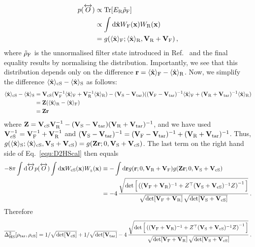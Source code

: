 \documentclass[aps,prx,onecolumn,superscriptaddress,floatfix,longbibliography,amsmath,amssymb]{revtex4-2}
\newcommand{\fil}{_{\text F}}
\newcommand{\rfil}{_{\text R}}
\newcommand{\sm}{_{\text S}}
\newcommand{\csm}{_{\rm cS}}
\newcommand{\tar}{_{\rm tar}}
\newcommand{\dd}{{\rm d}}
\newcommand{\bx}{\hat{\bf x}}
\newcommand{\tp}{^\top}
\newcommand{\ex}[1]{\langle #1 \rangle}
\newcommand{\both}[1]{\overleftrightarrow{#1}}
\newcommand{\Tr}{{\rm Tr}}
\newcommand{\inv}{^{-1}}
\newcommand{\beq}{\begin{equation}}
\newcommand{\eeq}{\end{equation}}
\begin{document}
\beq
\begin{split}
p(\both{O}) &\propto \Tr[E\rfil\tilde{\rho}\fil]\\
&\propto \int\dd\bx W\fil({\bf x})W\rfil({\bf x})\\
&= g(\ex{\bx}\fil;\ex{\bx}\rfil,{\bf V}\rfil + {\bf V}\fil)\,,\\
\end{split}
\eeq
where $\tilde{\rho}\fil$ is the unnormalised filter state introduced in Ref.~\cite{guevara2015quantum} and the final equality results by normalising the distribution. Importantly, we see that this distribution depends only on the difference ${\bf r} = \ex{\bx}\fil - \ex{\bx}\rfil$. Now, we simplify the difference $\ex{\bx}\csm - \ex{\bx}\sm$ as follows: 
\beq
\begin{split}
\ex{\bx}\csm - \ex{\bx}\sm &= {\bf V}\csm({\bf V}\fil\inv \ex{\bx}\fil + {\bf V}\rfil\inv \ex{\bx}\rfil) - ({\bf V}\sm - {\bf V}\tar)(({\bf V}\fil - {\bf V}\tar)\inv \ex{\bx}\fil + ({\bf V}\rfil + {\bf V}\tar)\inv \ex{\bx}\rfil)\\
& = {\bf Z}(\ex{\bx}\rfil - \ex{\bx}\fil)\\
& = {\bf Z}{\bf r} 
\end{split}\label{eq:csm_sm_diff}
\eeq
where ${\bf Z} = {\bf V}_{\rm cS} {\bf V}\rfil^{-1} - ({\bf V}\sm - {\bf V}\tar)({\bf V}\rfil + {\bf V}\tar)^{-1}$, and we have used ${\bf V}\csm\inv = {\bf V}\fil\inv + {\bf V}\rfil\inv$ and $({\bf V}\sm - {\bf V}\tar)\inv = ({\bf V}\fil - {\bf V}\tar)\inv + ({\bf V}\rfil + {\bf V}\tar)\inv$. Thus, $g(\ex{\bx}\sm;\ex{\bx}_{\rm cS},{\bf V}\sm + {\bf V}_{\rm cS}) = g({\bf Z}{\bf r};0,{\bf V}\sm + {\bf V}_{\rm cS})$. The last term on the right hand side of Eq.~\eqref{equ:D2HScal} then equals
\beq
\begin{split}
-8\pi\int \dd\both{O} p(\both{O}) \int\dd{\bf x} W_{\rm cS}({\bf x})W_{\sm}({\bf x})&\equiv -\int \dd{\bf r} g({\bf r};0,{\bf V}\rfil + {\bf V}\fil)g({\bf Z}{\bf r};0,{\bf V}\sm + {\bf V}_{\rm cS}) \\
&= -4\,\frac{\sqrt{\det\Big[\left(({\bf V}\fil+{\bf V}\rfil)\inv + Z\tp ({\bf V}\sm + {\bf V}\csm)\inv Z\right)\inv\Big]}}{\sqrt{\det[{\bf V}\fil+{\bf V}\rfil]}\,\sqrt{\det[{\bf V}\sm+{\bf V}\csm]}}\,.
\end{split}
\eeq
Therefore%
\beq
\overline{\Delta^2_{\rm HS}}[\rho_{\rm tar},\rho_{\rm cS}] =  1/\sqrt{\det[{\bf V_{\rm cS}}]} + 1/\sqrt{\det[{\bf V_{\rm tar}}]} - 4\,\frac{\sqrt{\det\Big[\left(({\bf V}\fil+{\bf V}\rfil)\inv + Z\tp ({\bf V}\sm + {\bf V}\csm)\inv Z\right)\inv\Big]}}{\sqrt{\det[{\bf V}\fil+{\bf V}\rfil]}\,\sqrt{\det[{\bf V}\sm+{\bf V}\csm]}}\,.
\eeq
\end{document}
